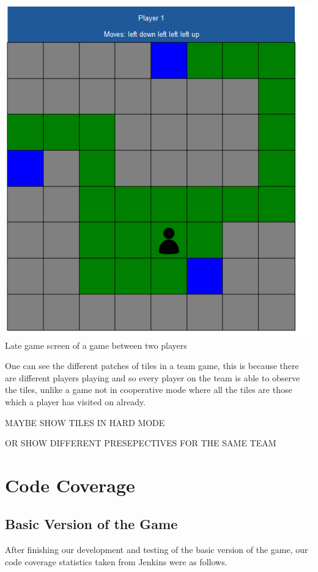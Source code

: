 \documentclass[a4paper,12pt]{extarticle}
\begin{document}
\begin{center}
\includegraphics[scale=0.5]{Team2.png}\\
Late game screen of a game between two players
\end{center}

One can see the different patches of tiles in a team game, this is because there are different players playing and so every player on the team is able to observe the tiles, unlike a game not in cooperative mode where all the tiles are those which a player has visited on already.

MAYBE SHOW TILES IN HARD MODE

OR SHOW DIFFERENT PRESEPECTIVES FOR THE SAME TEAM 

\newpage 
\section{Code Coverage}
\subsection{Basic Version of the Game}

After finishing our development and testing of the basic version of the game, our code coverage statistics taken from Jenkins were as follows.
\end{document}

